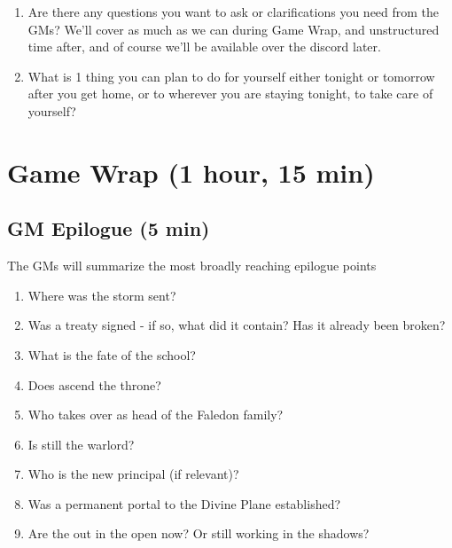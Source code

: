 \documentclass[green]{GL2020}
\begin{document}
\begin{enumerate}
\begin{enumerate}
		\item Are there any questions you want to ask or clarifications you need from the GMs? We’ll cover as much as we can during Game Wrap, and unstructured time after, and of course we’ll be available over the discord later.
		\item What is 1 thing you can plan to do for yourself either tonight or tomorrow after you get home, or to wherever you are staying tonight, to take care of yourself?
	\end{enumerate}
\end{enumerate}

\section*{Game Wrap (1 hour, 15 min)}

\subsection*{GM Epilogue (5 min)}
The GMs will summarize the most broadly reaching epilogue points
\begin{enumerate}
	\item Where was the storm sent?
	\item Was a treaty signed - if so, what did it contain? Has it already been broken?
	\item What is the fate of the school?
	\item Does \cPrince{} ascend the throne?
	\item Who takes over as head of the Faledon family?
	\item Is \cLoud{} still the warlord?
	\item Who is the new principal (if relevant)?
	\item Was a permanent portal to the Divine Plane established?
	\item Are the \pGoaties{} out in the open now? Or still working in the shadows?
\end{enumerate}
\end{document}

